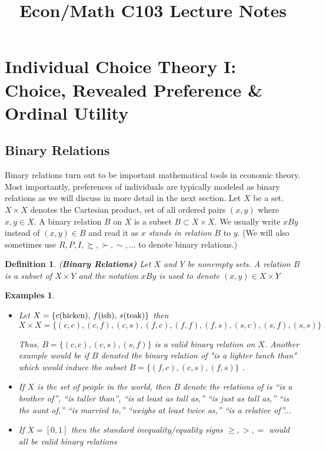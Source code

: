 \documentclass[12pt]{article}
\title{\textbf{Econ/Math C103 Lecture Notes}}
\author{}
\date{}
\newtheorem{defin}{Definition}
\newtheorem{unex}[ex]{Examples}
\newcommand{\tn}[1]{\textnormal{#1}}
\newcommand{\name}[1]{\tn{(\textbf{#1)}}}
\newcommand{\pref}{\succsim}
\newcommand{\spref}{\succ}
\newcommand{\3}{\vspace*{3mm}}
\begin{document}
\maketitle
\tableofcontents





\newpage

\section{Individual Choice Theory I: Choice, Revealed Preference \& Ordinal Utility}
\subsection{Binary Relations}

Binary relations turn out to be important mathematical tools in economic theory. Most importantly, preferences of individuals are typically modeled as binary relations as we will discuss in more detail in the next section. Let $X$ be a set. $X \times X$ denotes the Cartesian product, set of all ordered pairs $(x, y)$ where $x, y \in X$. A binary relation $B$ on $X$ is a subset $B \subset X \times X$. We usually write $xBy$ instead of $(x, y) \in B$ and read it as $x$ \emph{stands in relation $B$} to $y$. (We will also sometimes use $R, P , I, \pref, \spref, \sim,$... to denote binary relations.)

\begin{defin} 

\name{Binary Relations} \tn{Let $X$ and $Y$ be nonempty sets. A relation $B$ is a subset of $X \times Y$ and the notation $x B y$ is used to denote $(x,y) \in X \times Y $}

\end{defin}

\begin{unex}
\
\begin{itemize}
\item \tn{Let} $X = \{\tn{$c$(hicken), $f$(ish), $s$(teak)} \}$ \tn{then} 
\[ X \times X = \{(c,c), (c,f), (c,s), (f,c), (f,f), (f,s), (s,c), (s,f), (s,s)\}\]

\tn{Thus, $B = \{(c,c), (c,s), (s,f) \}$ is a valid binary relation on $X$. Another example would be if $B$ denoted the binary relation of "is a lighter lunch than" which would induce the subset $B = \{(f,c), (c,s), (f,s) \}$  }.

\item  \tn{If $X$ is the set of people in the world, then $B$ denote the relations of is “is a brother of”, “is taller than”, “is at
least as tall as,” “is just as tall as,” “is the aunt of,” “is married to,” “weighs at
least twice as,” “is a relative of”...}

\item \tn{If $X = [0,1]$ then the standard inequality/equality signs $\geq, >, =$ would all be valid binary relations}
\end{itemize}

\end{unex}
\end{document}
